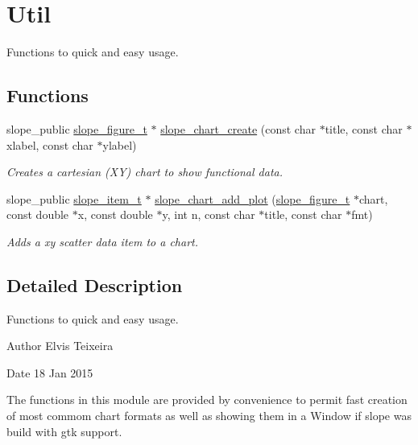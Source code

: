 \hypertarget{group__Util}{\section{Util}
\label{group__Util}
}


Functions to quick and easy usage.  


\subsection*{Functions}
\begin{DoxyCompactItemize}
\item 
slope\+\_\+public \hyperlink{group__Figure_ga507cc82eeca8255d6c0f603ffdaeb59e}{slope\+\_\+figure\+\_\+t} $\ast$ \hyperlink{group__Util_ga77120ea4a95ebd421a60eac8f84c6a70}{slope\+\_\+chart\+\_\+create} (const char $\ast$title, const char $\ast$xlabel, const char $\ast$ylabel)
\begin{DoxyCompactList}\small\item\em Creates a cartesian (X\+Y) chart to show functional data. \end{DoxyCompactList}\item 
slope\+\_\+public \hyperlink{group__Item_ga2616141f0e164a876049da51ea3a8646}{slope\+\_\+item\+\_\+t} $\ast$ \hyperlink{group__Util_gafa9d2cd55773dfe727bb6e76d8223ad6}{slope\+\_\+chart\+\_\+add\+\_\+plot} (\hyperlink{group__Figure_ga507cc82eeca8255d6c0f603ffdaeb59e}{slope\+\_\+figure\+\_\+t} $\ast$chart, const double $\ast$x, const double $\ast$y, int n, const char $\ast$title, const char $\ast$fmt)
\begin{DoxyCompactList}\small\item\em Adds a xy scatter data item to a chart. \end{DoxyCompactList}\end{DoxyCompactItemize}


\subsection{Detailed Description}
Functions to quick and easy usage. 

\begin{DoxyAuthor}{Author}
Elvis Teixeira 
\end{DoxyAuthor}
\begin{DoxyDate}{Date}
18 Jan 2015
\end{DoxyDate}
The functions in this module are provided by convenience to permit fast creation of most commom chart formats as well as showing them in a Window if slope was build with gtk support. 

